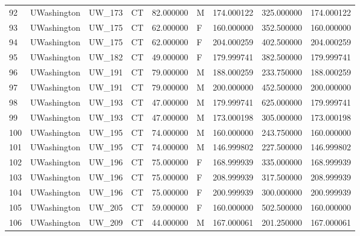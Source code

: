 \begin{tabular}{llllrlrrr}
92     &     UWashington &       UW\_173 &                 CT &  82.000000 &        M &       174.000122 &    325.000000 &  174.000122 \\
93     &     UWashington &       UW\_175 &                 CT &  62.000000 &        F &       160.000000 &    352.500000 &  160.000000 \\
94     &     UWashington &       UW\_175 &                 CT &  62.000000 &        F &       204.000259 &    402.500000 &  204.000259 \\
95     &     UWashington &       UW\_182 &                 CT &  49.000000 &        F &       179.999741 &    382.500000 &  179.999741 \\
96     &     UWashington &       UW\_191 &                 CT &  79.000000 &        M &       188.000259 &    233.750000 &  188.000259 \\
97     &     UWashington &       UW\_191 &                 CT &  79.000000 &        M &       200.000000 &    452.500000 &  200.000000 \\
98     &     UWashington &       UW\_193 &                 CT &  47.000000 &        M &       179.999741 &    625.000000 &  179.999741 \\
99     &     UWashington &       UW\_193 &                 CT &  47.000000 &        M &       173.000198 &    305.000000 &  173.000198 \\
100    &     UWashington &       UW\_195 &                 CT &  74.000000 &        M &       160.000000 &    243.750000 &  160.000000 \\
101    &     UWashington &       UW\_195 &                 CT &  74.000000 &        M &       146.999802 &    227.500000 &  146.999802 \\
102    &     UWashington &       UW\_196 &                 CT &  75.000000 &        F &       168.999939 &    335.000000 &  168.999939 \\
103    &     UWashington &       UW\_196 &                 CT &  75.000000 &        F &       208.999939 &    317.500000 &  208.999939 \\
104    &     UWashington &       UW\_196 &                 CT &  75.000000 &        F &       200.999939 &    300.000000 &  200.999939 \\
105    &     UWashington &       UW\_205 &                 CT &  59.000000 &        F &       160.000000 &    502.500000 &  160.000000 \\
106    &     UWashington &       UW\_209 &                 CT &  44.000000 &        M &       167.000061 &    201.250000 &  167.000061 \\

\end{tabular}
